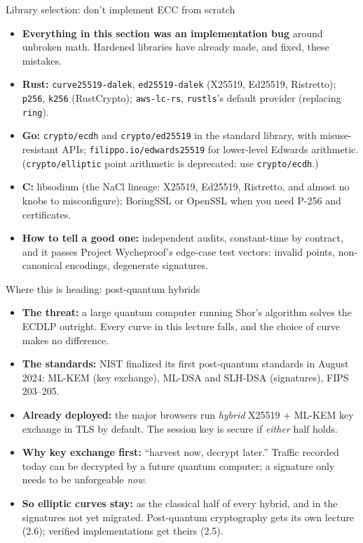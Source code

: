 \ifdefined\PRESENTATION\else\PassOptionsToClass{handout}{beamer}\fi\documentclass[aspectratio=169, lualatex]{beamer}
\begin{document}
\begin{frame}{Library selection: don't implement ECC from scratch}
	\begin{itemize}
		\item \textbf{Everything in this section was an implementation bug} around unbroken math. Hardened libraries have already made, and fixed, these mistakes.
		\item \textbf{Rust:} \texttt{curve25519-dalek}, \texttt{ed25519-dalek} (X25519, Ed25519, Ristretto); \texttt{p256}, \texttt{k256} (RustCrypto); \texttt{aws-lc-rs}, \texttt{rustls}'s default provider (replacing \texttt{ring}).
		\item \textbf{Go:} \texttt{crypto/ecdh} and \texttt{crypto/ed25519} in the standard library, with misuse-resistant APIs; \texttt{filippo.io/edwards25519} for lower-level Edwards arithmetic. (\texttt{crypto/elliptic} point arithmetic is deprecated: use \texttt{crypto/ecdh}.)
		\item \textbf{C:} libsodium (the NaCl lineage: X25519, Ed25519, Ristretto, and almost no knobs to misconfigure); BoringSSL or OpenSSL when you need P-256 and certificates.
		\item \textbf{How to tell a good one:} independent audits, constant-time by contract, and it passes Project Wycheproof's edge-case test vectors: invalid points, non-canonical encodings, degenerate signatures.
	\end{itemize}
\end{frame}

\begin{frame}{Where this is heading: post-quantum hybrids}
	\begin{itemize}
		\item \textbf{The threat:} a large quantum computer running Shor's algorithm solves the ECDLP outright. Every curve in this lecture falls, and the choice of curve makes no difference.
		\item \textbf{The standards:} NIST finalized its first post-quantum standards in August 2024: ML-KEM (key exchange), ML-DSA and SLH-DSA (signatures), FIPS 203--205.
		\item \textbf{Already deployed:} the major browsers run \emph{hybrid} X25519 + ML-KEM key exchange in TLS by default. The session key is secure if \emph{either} half holds.
		\item \textbf{Why key exchange first:} ``harvest now, decrypt later.'' Traffic recorded today can be decrypted by a future quantum computer; a signature only needs to be unforgeable \emph{now}.
		\item \textbf{So elliptic curves stay:} as the classical half of every hybrid, and in the signatures not yet migrated. Post-quantum cryptography gets its own lecture (2.6); verified implementations get theirs (2.5).
	\end{itemize}
\end{frame}
\end{document}
